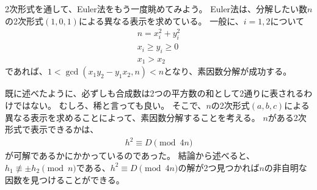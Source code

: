 2次形式を通して、Euler法をもう一度眺めてみよう。
Euler法は、分解したい数$n$の2次形式$(1,0,1)$による異なる表示を求めている。
一般に、$i=1,2$について
\begin{align*}
n = x_i^2 + y_i^2\\
x_i \ge y_i \ge 0\\
x_1 > x_2
\end{align*}
であれば、$1<\gcd(x_1y_2 - y_1x_2, n) < n$となり、素因数分解が成功する。

既に述べたように、必ずしも合成数は2つの平方数の和として2通りに表されるわけではない。
むしろ、稀と言っても良い。
そこで、$n$の2次形式$(a,b,c)$による異なる表示を求めることによって、素因数分解することを考える。
$n$がある2次形式で表示できるかは、
\begin{align*}
h^2 \equiv D \pmod{4n}
\end{align*}
が可解であるかにかかっているのであった。
結論から述べると、$h_1 \not\equiv \pm h_2 \pmod{n}$である、$h^2\equiv D\pmod{4n}$の解が2つ見つかれば$n$の非自明な因数を見つけることができる。

